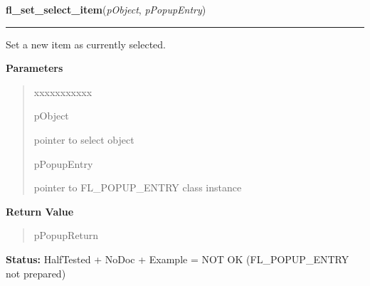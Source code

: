 \hspace{.8\funcindent}\begin{boxedminipage}{\funcwidth}

    \raggedright \textbf{fl\_set\_select\_item}(\textit{pObject}, \textit{pPopupEntry})

    \vspace{-1.5ex}

    \rule{\textwidth}{0.5\fboxrule}
\setlength{\parskip}{2ex}
    Set a new item as currently selected.

\setlength{\parskip}{1ex}
      \textbf{Parameters}
      \vspace{-1ex}

      \begin{quote}
        \begin{Ventry}{xxxxxxxxxxx}

          \item[pObject]

          pointer to select object

          \item[pPopupEntry]

          pointer to FL\_POPUP\_ENTRY class instance

        \end{Ventry}

      \end{quote}

      \textbf{Return Value}
    \vspace{-1ex}

      \begin{quote}
      pPopupReturn

      \end{quote}

\textbf{Status:} HalfTested + NoDoc + Example = NOT OK (FL\_POPUP\_ENTRY not prepared)



    \end{boxedminipage}

    \label{xformslib:library:fl_get_select_item_by_value}

    \vspace{0.5ex}


